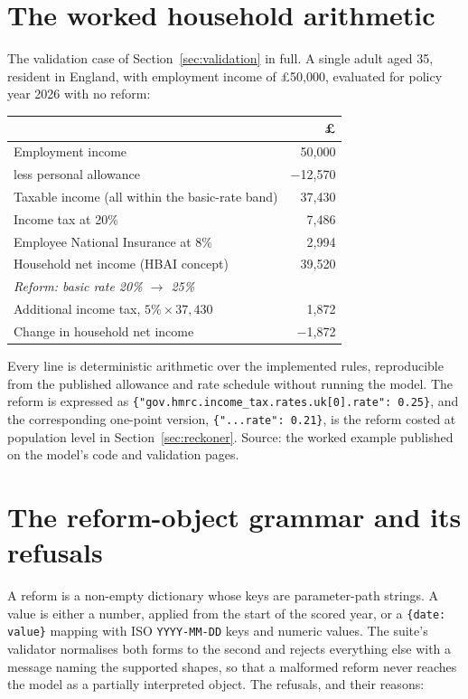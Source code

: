 \section{The worked household arithmetic}
\label{app:arith}

The validation case of Section~\ref{sec:validation} in full. A single adult aged 35, resident in England, with employment income of \pounds 50{,}000, evaluated for policy year 2026 with no reform:

\begin{center}
\begin{tabular}{lr}
\toprule
 & \pounds \\
\midrule
Employment income & 50{,}000 \\
less personal allowance & $-$12{,}570 \\
\midrule
Taxable income (all within the basic-rate band) & 37{,}430 \\
Income tax at 20\% & 7{,}486 \\
Employee National Insurance at 8\% & 2{,}994 \\
\midrule
Household net income (HBAI concept) & 39{,}520 \\
\midrule
\multicolumn{2}{l}{\emph{Reform: basic rate 20\% $\rightarrow$ 25\%}} \\
Additional income tax, $5\% \times 37{,}430$ & 1{,}872 \\
Change in household net income & $-$1{,}872 \\
\bottomrule
\end{tabular}
\end{center}

\medskip
\noindent Every line is deterministic arithmetic over the implemented rules, reproducible from the published allowance and rate schedule without running the model. The reform is expressed as \texttt{\{"gov.hmrc.income\_tax.rates.uk[0].rate": 0.25\}}, and the corresponding one-point version, \texttt{\{"...rate": 0.21\}}, is the reform costed at population level in Section~\ref{sec:reckoner}. Source: the worked example published on the model's code and validation pages.

\section{The reform-object grammar and its refusals}
\label{app:grammar}

A reform is a non-empty dictionary whose keys are parameter-path strings. A value is either a number, applied from the start of the scored year, or a \texttt{\{date: value\}} mapping with ISO \texttt{YYYY-MM-DD} keys and numeric values. The suite's validator normalises both forms to the second and rejects everything else with a message naming the supported shapes, so that a malformed reform never reaches the model as a partially interpreted object. The refusals, and their reasons:

